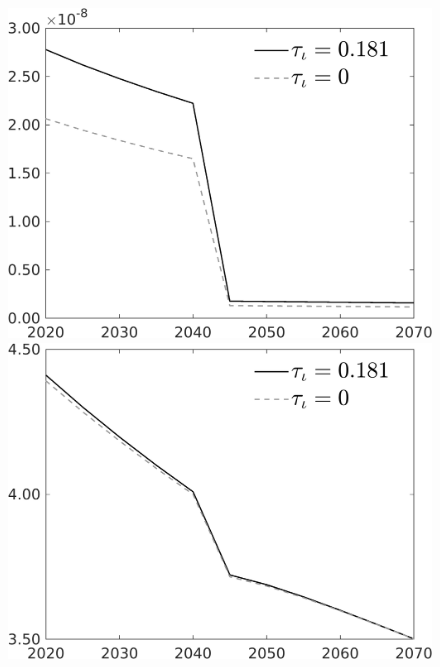 \documentclass[12pt]{article}
\begin{document}
\begin{figure}[h!!]
\begin{minipage}[]{0.32\textwidth}
	\end{minipage}	
	\begin{minipage}[]{0.32\textwidth}
		\includegraphics[width=1\textwidth]{../../codding_model/own_basedOnFried/optimalPol_010922_revision/figures/all_13Sept22/CompTauf_bytaul_Reg0_gAf_spillover0_nsk1_xgr0_knspil0_sep0_LFlimit1_emsbase0_countec0_GovRev0_etaa0.79_lgd1.png}
	\end{minipage}	
	\begin{minipage}[]{0.32\textwidth}
		\includegraphics[width=1\textwidth]{../../codding_model/own_basedOnFried/optimalPol_010922_revision/figures/all_13Sept22/CompTauf_bytaul_Reg0_gAn_spillover0_nsk1_xgr0_knspil0_sep0_LFlimit1_emsbase0_countec0_GovRev0_etaa0.79_lgd1.png}

\end{minipage}
\end{figure}
\end{document}

